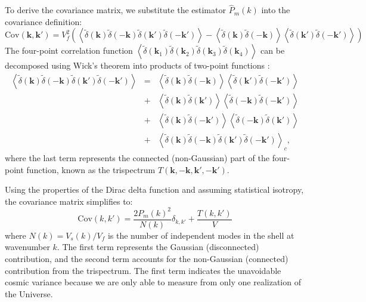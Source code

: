 To derive the covariance matrix, we substitute the estimator \( \hat{P}_m(k) \) into the covariance definition:
\begin{equation}
    \mathrm{Cov}(\mathbf{k}, \mathbf{k'}) = V_f^2 \left( \left\langle \tilde{\delta}(\mathbf{k}) \tilde{\delta}(-\mathbf{k}) \tilde{\delta}(\mathbf{k'}) \tilde{\delta}(-\mathbf{k'}) \right\rangle - \left\langle \tilde{\delta}(\mathbf{k}) \tilde{\delta}(-\mathbf{k}) \right\rangle \left\langle \tilde{\delta}(\mathbf{k'}) \tilde{\delta}(-\mathbf{k'}) \right\rangle\right)
\end{equation}
The four-point correlation function \( \left\langle \tilde{\delta}(\mathbf{k}_1) \tilde{\delta}(\mathbf{k}_2) \tilde{\delta}(\mathbf{k}_3) \tilde{\delta}(\mathbf{k}_4) \right\rangle \) can be decomposed using Wick's theorem into products of two-point functions \citep{PhysRev.80.268}:
\begin{eqnarray}
    \left\langle \tilde{\delta}(\mathbf{k}) \tilde{\delta}(-\mathbf{k}) \tilde{\delta}(\mathbf{k'}) \tilde{\delta}(-\mathbf{k'}) \right\rangle 
    &=& \left\langle \tilde{\delta}(\mathbf{k}) \tilde{\delta}(-\mathbf{k}) \right\rangle \left\langle \tilde{\delta}(\mathbf{k'}) \tilde{\delta}(-\mathbf{k'}) \right\rangle \nonumber \\
    &+& \left\langle \tilde{\delta}(\mathbf{k}) \tilde{\delta}(\mathbf{k'}) \right\rangle \left\langle \tilde{\delta}(-\mathbf{k}) \tilde{\delta}(-\mathbf{k'}) \right\rangle \nonumber \\
    &+& \left\langle \tilde{\delta}(\mathbf{k}) \tilde{\delta}(-\mathbf{k'}) \right\rangle \left\langle \tilde{\delta}(-\mathbf{k}) \tilde{\delta}(\mathbf{k'}) \right\rangle \nonumber \\ 
    &+& \left\langle \tilde{\delta}(\mathbf{k}) \tilde{\delta}(-\mathbf{k}) \tilde{\delta}(\mathbf{k'}) \tilde{\delta}(-\mathbf{k'}) \right\rangle_c,
\end{eqnarray}
where the last term represents the connected (non-Gaussian) part of the four-point function, known as the trispectrum \( T(\mathbf{k}, -\mathbf{k}, \mathbf{k}', -\mathbf{k}') \).

Using the properties of the Dirac delta function and assuming statistical isotropy, the covariance matrix simplifies to:
\begin{equation}
    \mathrm{Cov}(k, k') = \frac{2 P_m(k)^2}{N(k)} \delta_{k,k'} + \frac{T(k, k')}{V}
\end{equation}
where \( N(k) = V_s(k) / V_f \) is the number of independent modes in the shell at wavenumber \( k \). The first term represents the Gaussian (disconnected) contribution, and the second term accounts for the non-Gaussian (connected) contribution from the trispectrum. The first term indicates the unavoidable cosmic variance because we are only able to measure from only one realization of the Universe.

